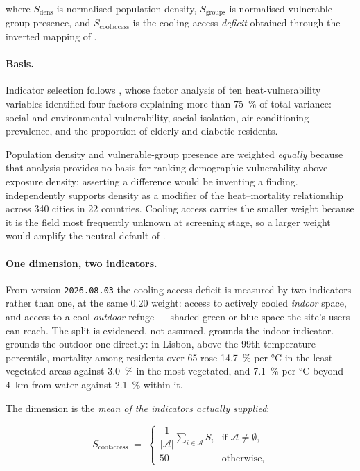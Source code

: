 where $S_{\mathrm{dens}}$ is normalised population density,
$S_{\mathrm{groups}}$ is normalised vulnerable-group presence, and
$S_{\mathrm{coolaccess}}$ is the cooling access \emph{deficit} obtained through
the inverted mapping of .

\paragraph{Basis.} Indicator selection follows \textcite{reid2009}, whose
factor analysis of ten heat-vulnerability variables identified four factors
explaining more than \SI{75}{\percent} of total variance: social and
environmental vulnerability, social isolation, air-conditioning prevalence, and
the proportion of elderly and diabetic residents.

Population density and vulnerable-group presence are weighted \emph{equally}
because that analysis provides no basis for ranking demographic vulnerability
above exposure density; asserting a difference would be inventing a finding.
\textcite{sera2019} independently supports density as a modifier of the
heat--mortality relationship across \num{340} cities in \num{22} countries.
Cooling access carries the smaller weight because it is the field most
frequently unknown at screening stage, so a larger weight would amplify the
neutral default of .

\paragraph{One dimension, two indicators.} From version \texttt{2026.08.03}
the cooling access deficit is measured by two indicators rather than one, at
the same \num{0.20} weight: access to actively cooled \emph{indoor} space, and
access to a cool \emph{outdoor} refuge --- shaded green or blue space the
site's users can reach. The split is evidenced, not assumed.
\textcite{reid2009} grounds the indoor indicator. \textcite{burkart2016}
grounds the outdoor one directly: in Lisbon, above the 99th temperature
percentile, mortality among residents over \num{65} rose
\SI{14.7}{\percent} per \si{\degreeCelsius} in the least-vegetated areas
against \SI{3.0}{\percent} in the most vegetated, and \SI{7.1}{\percent} per
\si{\degreeCelsius} beyond \SI{4}{\kilo\metre} from water against
\SI{2.1}{\percent} within it.

The dimension is the \emph{mean of the indicators actually supplied}:

\begin{equation}
\label{eq:coolaccess}
S_{\mathrm{coolaccess}} \;=\;
\begin{cases}
  \dfrac{1}{\lvert \mathcal{A}\rvert} \displaystyle\sum_{i \in \mathcal{A}} S_i
    & \text{if } \mathcal{A} \neq \emptyset,\\[2ex]
  50 & \text{otherwise,}
\end{cases}
\end{equation}

